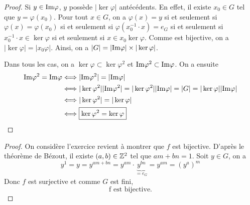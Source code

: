 \documentclass[12pt]{article}
\begin{document}
\begin{proof}
	Si $y\in \mathrm{Im}\varphi$, $y$ possède $\vert\ker\varphi\vert$ antécédents. En effet, il existe $x_{0}\in G$ tel que $y=\varphi(x_{0})$. Pour tout $x\in G$, on a $\varphi(x)=y$ si et seulement si $\varphi(x)=\varphi(x_{0})$ si et seulement si $\varphi(x_{0}^{-1}\cdot x)=e_{G}$ si et seulement si $x_{0}^{-1}\cdot x\in\ker\varphi$ si et seulement si $x\in x_{0}\ker\varphi$. Comme 
	est bijective, on a $\vert\ker\varphi\vert=\vert x_{0}\varphi\vert$. Ainsi, on a $\vert G\vert=\vert\mathrm{Im}\varphi\vert\times\vert\ker\varphi\vert$.

	Dans tous les cas, on a $\ker\varphi\subset\ker\varphi^{2}$ et $\mathrm{Im}\varphi^{2}\subset\mathrm{Im}\varphi$. On a ensuite 
	\begin{align}
		\mathrm{Im}\varphi^{2}=\mathrm{Im}\varphi
		&\Longleftrightarrow \vert\mathrm{Im}\varphi^{2}\vert=\vert\mathrm{Im}\varphi\vert\\
		&\Longleftrightarrow \vert\ker\varphi^{2}\vert\vert\mathrm{Im}\varphi^{2}\vert=\vert\ker\varphi^{2}\vert\vert\mathrm{Im}\varphi\vert=\vert G\vert=\vert\ker\varphi\vert\vert\mathrm{Im}\varphi\vert\\
		&\Longleftrightarrow \vert\ker\varphi^{2}\vert=\vert\ker\varphi\vert\\
		&\Longleftrightarrow \boxed{\ker\varphi^{2}=\ker\varphi}
	\end{align}
\end{proof}

\begin{proof}
	On considère 
	l'exercice revient à montrer que $f$ est bijective. D'après le théorème de Bézout, il existe $(a,b)\in\mathbb{Z}^{2}$ tel que $am+bn=1$. Soit $y\in G$, on a 
	\begin{equation}
		y^{1}=y=y^{am+bn}=y^{am}\cdot \underbrace{y^{bn}}_{=e_{G}}=y^{am}=(y^{a})^{m}
	\end{equation}
	Donc $f$ est surjective et comme $G$ est fini, 
	\begin{equation}
		\boxed{\text{f est bijective.}}
	\end{equation}
\end{proof}
\end{document}
